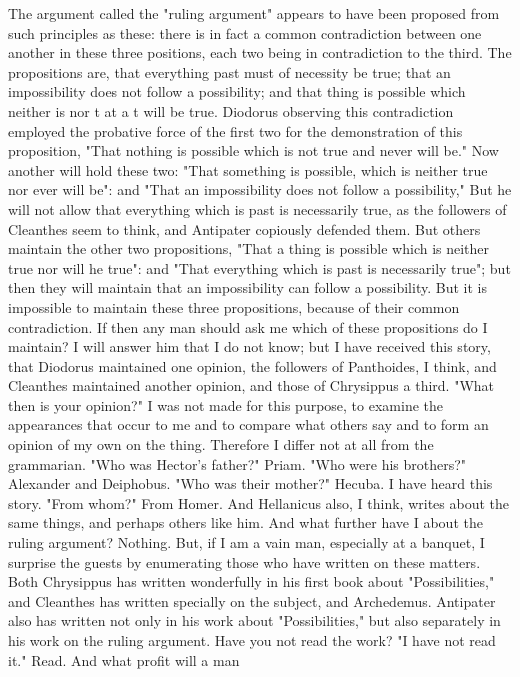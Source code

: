 \documentclass[a4paper]{article}
\begin{document}
    The argument called the "ruling argument" appears to have been proposed
from such principles as these: there is in fact a common contradiction between
one another in these three positions, each two being in contradiction to the
third. The propositions are, that everything past must of necessity be true;
that an impossibility does not follow a possibility; and that thing is possible
which neither is nor t at a t will be true. Diodorus observing this
contradiction employed the probative force of the first two for the
demonstration of this proposition, "That nothing is possible which is not true
and never will be." Now another will hold these two: "That something is
possible, which is neither true nor ever will be": and "That an impossibility
does not follow a possibility," But he will not allow that everything which is
past is necessarily true, as the followers of Cleanthes seem to think, and
Antipater copiously defended them. But others maintain the other two
propositions, "That a thing is possible which is neither true nor will he
true": and "That everything which is past is necessarily true"; but then they
will maintain that an impossibility can follow a possibility. But it is
impossible to maintain these three propositions, because of their common
contradiction. If then any man should ask me which of these propositions do I
maintain? I will answer him that I do not know; but I have received this story,
that Diodorus maintained one opinion, the followers of Panthoides, I think, and
Cleanthes maintained another opinion, and those of Chrysippus a third. "What
then is your opinion?" I was not made for this purpose, to examine the
appearances that occur to me and to compare what others say and to form an
opinion of my own on the thing. Therefore I differ not at all from the
grammarian. "Who was Hector's father?" Priam. "Who were his brothers?"
Alexander and Deiphobus. "Who was their mother?" Hecuba. I have heard this
story. "From whom?" From Homer. And Hellanicus also, I think, writes about the
same things, and perhaps others like him. And what further have I about the
ruling argument? Nothing. But, if I am a vain man, especially at a banquet, I
surprise the guests by enumerating those who have written on these matters.
Both Chrysippus has written wonderfully in his first book about
"Possibilities," and Cleanthes has written specially on the subject, and
Archedemus. Antipater also has written not only in his work about
"Possibilities," but also separately in his work on the ruling argument. Have
you not read the work? "I have not read it." Read. And what profit will a man
\end{document}
